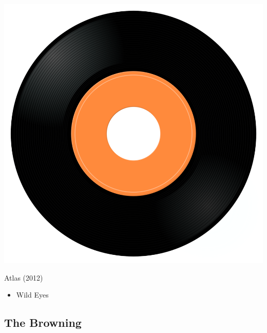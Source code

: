 \begin{minipage}[t]{0.25\textwidth}\vspace{0pt}
\captionsetup{type=figure}
\includegraphics[width=\textwidth]{Images/cover.png}
\caption*{Atlas (2012)}
\end{minipage}
\begin{minipage}[t]{0.25\textwidth}\vspace{0pt}
\begin{itemize}[nosep,leftmargin=1em,labelwidth=*,align=left]
	\setlength{\itemsep}{0pt}
	\item Wild Eyes
\end{itemize}
\end{minipage}


\subsection{The Browning}

